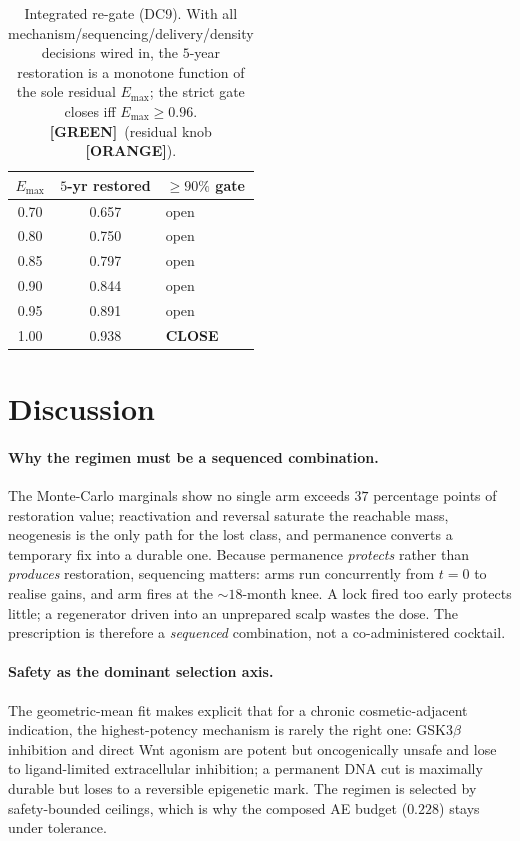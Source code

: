 \documentclass[11pt,a4paper]{article}
\newcommand{\tierbadge}[2]{\textcolor{#1}{\textbf{[#2]}}}
\providecommand{\tierGreen}{\tierbadge{green!45!black}{GREEN}}
\providecommand{\tierOrange}{\tierbadge{orange!80!black}{ORANGE}}
\newcommand{\arm}[1]{\raisebox{0.10ex}{\textcircled{\scriptsize #1}}}
\begin{document}
\begin{table}[h]\centering\small
\begin{tabular}{ccl}
\toprule
\textbf{$E_{\max}$} & \textbf{$5$-yr restored} & \textbf{$\geq\!90\%$ gate} \\
\midrule
0.70 & 0.657 & open \\
0.80 & 0.750 & open \\
0.85 & 0.797 & open \\
0.90 & 0.844 & open \\
0.95 & 0.891 & open \\
1.00 & 0.938 & \textbf{CLOSE} \\
\bottomrule
\end{tabular}
\caption{Integrated re-gate (DC9). With all mechanism/sequencing/delivery/density
decisions wired in, the $5$-year restoration is a monotone function of the sole residual
$E_{\max}$; the strict gate closes iff $E_{\max}\geq 0.96$. \tierGreen\ (residual knob
\tierOrange).}
\label{tab:regate}
\end{table}

\section{Discussion}
\label{sec:discussion}
\paragraph{Why the regimen must be a sequenced combination.} The Monte-Carlo marginals
show no single arm exceeds $37$ percentage points of restoration value; reactivation and
reversal saturate the reachable mass, neogenesis is the only path for the lost class, and
permanence converts a temporary fix into a durable one. Because permanence \emph{protects}
rather than \emph{produces} restoration, sequencing matters: arms \arm{1}\arm{2}\arm{4} run concurrently
from $t\!=\!0$ to realise gains, and arm\arm{3} fires at the $\sim\!18$-month knee. A lock fired
too early protects little; a regenerator driven into an unprepared scalp wastes the dose.
The prescription is therefore a \emph{sequenced} combination, not a co-administered
cocktail.

\paragraph{Safety as the dominant selection axis.} The geometric-mean fit makes explicit
that for a chronic cosmetic-adjacent indication, the highest-potency mechanism is rarely
the right one: GSK3$\beta$ inhibition and direct Wnt agonism are potent but oncogenically
unsafe and lose to ligand-limited extracellular inhibition; a permanent DNA cut is
maximally durable but loses to a reversible epigenetic mark. The regimen is selected by
safety-bounded ceilings, which is why the composed AE budget ($0.228$) stays under
tolerance.
\end{document}
